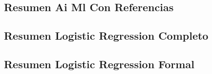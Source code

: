 \documentclass[
]{article}
\begin{document}
\subsection{Resumen Ai Ml Con
Referencias}\label{resumen-ai-ml-con-referencias-1}



\subsection{Resumen Logistic Regression
Completo}\label{resumen-logistic-regression-completo-1}



\subsection{Resumen Logistic Regression
Formal}\label{resumen-logistic-regression-formal-1}
\end{document}
